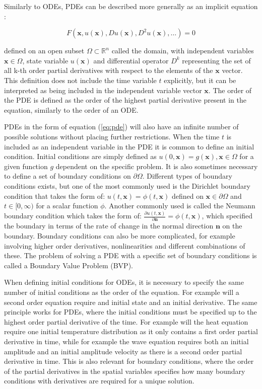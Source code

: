 Similarly to ODEs, PDEs can be described more generally as an implicit equation \cite{pdebook}:

\begin{equation}
    F(\bm{x}, u(\bm{x}), D u(\bm{x}), D^2 u(\bm{x}), \dots) = 0
    \label{eq:pde}
\end{equation}

\noindent defined on an open subset $\Omega \subset \mathbb{R}^n$ called the domain, with independent variables $\bm{x} \in \Omega$, state variable $u(\bm{x})$ and differential operator $D^k$ representing the set of all k-th order partial derivatives with respect to the elements of the $\bm{x}$ vector. This definition does not include the time variable $t$ explicitly, but it can be interpreted as being included in the independent variable vector $\bm{x}$. The order of the PDE is defined as the order of the highest partial derivative present in the equation, similarly to the order of an ODE.

PDEs in the form of equation (\ref{eq:pde}) will also have an infinite number of possible solutions without placing further restrictions. When the time $t$ is included as an independent variable in the PDE it is common to define an initial condition. Initial conditions are simply defined as $u(0, \bm{x}) = g(\bm{x}), \bm{x} \in \Omega$ for a given function $g$ dependent on the specific problem. It is also sometimes necessary to define a set of boundary conditions on $\partial \Omega$. Different types of boundary conditions exists, but one of the most commonly used is the Dirichlet boundary condition that takes the form of: $u(t, \bm{x}) = \phi(t, \bm{x})$ defined on $\bm{x} \in \partial \Omega$ and $t \in [0, \infty)$ for a scalar function $\phi$. Another commonly used is called the Neumann boundary condition which takes the form of: $\frac{\partial u(t, \bm{x})}{\partial \bm{n}} = \phi(t, \bm{x})$, which specified the boundary in terms of the rate of change in the normal direction $\bm{n}$ on the boundary. Boundary conditions can also be more complicated, for example involving higher order derivatives, nonlinearities and different combinations of these. The problem of solving a PDE with a specific set of boundary conditions is called a Boundary Value Problem (BVP).

When defining initial conditions for ODEs, it is necessary to specify the same number of initial conditions as the order of the equation. For example will a second order equation require and initial state and an initial derivative. The same principle works for PDEs, where the initial conditions must be specified up to the highest order partial derivative of the time. For example will the heat equation require one initial temperature distribution as it only contains a first order partial derivative in time, while for example the wave equation requires both an initial amplitude and an initial amplitude velocity as there is a second order partial derivative in time. This is also relevant for boundary conditions, where the order of the partial derivatives in the spatial variables specifies how many boundary conditions with derivatives are required for a unique solution.


